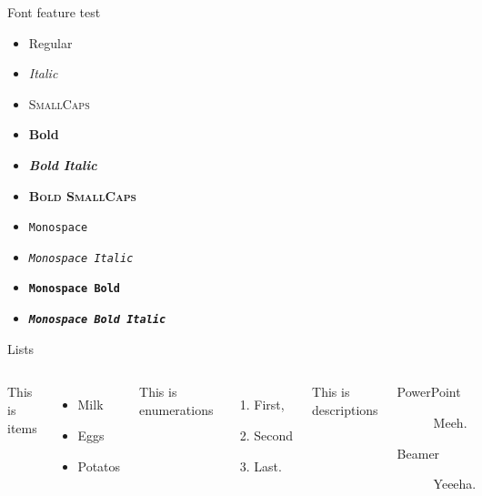 \documentclass[10pt]{beamer}
\begin{document}
\begin{frame}{Font feature test}
  \begin{itemize}
    \item Regular
    \item \textit{Italic}
    \item \textsc{SmallCaps}
    \item \textbf{Bold}
    \item \textbf{\textit{Bold Italic}}
    \item \textbf{\textsc{Bold SmallCaps}}
    \item \texttt{Monospace}
    \item \texttt{\textit{Monospace Italic}}
    \item \texttt{\textbf{Monospace Bold}}
    \item \texttt{\textbf{\textit{Monospace Bold Italic}}}
  \end{itemize}
\end{frame}



\begin{frame}{Lists}
  \begin{columns}[T,onlytextwidth]
  
		This is items
		\begin{itemize}
			\item Milk 
			\item Eggs 
			\item Potatos
		\end{itemize}

		This is enumerations
		\begin{enumerate}
        	\item First, 
        	\item Second 
        	\item Last.
		\end{enumerate}

		This is descriptions
      	\begin{description}
        	\item[PowerPoint] Meeh. 
        	\item[Beamer] Yeeeha.
      	\end{description}
      	
  \end{columns}
\end{frame}
\end{document}
